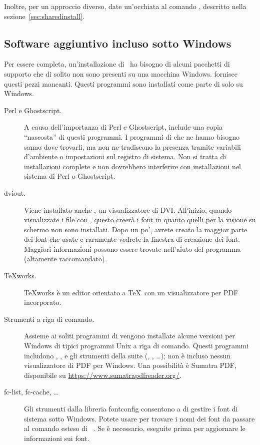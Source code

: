 \documentclass{article}
\begin{document}
Inoltre, per un approccio diverso, date un'occhiata al comando 
, descritto nella sezione~\ref{sec:sharedinstall}.

\subsection{Software aggiuntivo incluso sotto Windows}

Per essere completa, un'installazione di \TL\ ha bisogno di alcuni
pacchetti di supporto che di solito non sono presenti su una macchina
Windows. \TL{} fornisce questi pezzi mancanti. Questi programmi sono
installati come parte di \TL{} solo su Windows.

\begin{description}
\item[Perl e Ghostscript.] A causa dell'importanza di Perl e Ghostscript,
  \TL{} include una copia ``nascosta'' di questi programmi. I programmi di
  \TL{} che ne hanno bisogno sanno dove trovarli, ma non ne tradiscono la
  presenza tramite variabili d'ambiente o impostazioni sul registro di
  sistema. Non si tratta di installazioni complete e non dovrebbero
  interferire con installazioni nel sistema di Perl o Ghostscript.

\item[dviout.] Viene installato anche , un visualizzatore di
  DVI. All'inizio, quando visualizzate i file con ,
  questo creerà i font in quanto quelli per la visione su schermo non sono
  installati. Dopo un po', avrete creato la maggior parte dei font che
  usate e raramente vedrete la finestra di creazione dei font. Maggiori
  informazioni possono essere trovate nell'aiuto del programma (altamente
  raccomandato).

\item[\TeX{}works.] \TeX{}works è un editor orientato a \TeX\ con un
  visualizzatore per PDF incorporato.

\item[Strumenti a riga di comando.] Assieme ai soliti programmi di \TL{}
  vengono installate alcune versioni per Windows di tipici programmi Unix
  a riga di comando. Questi programmi includono ,
  ,  e gli strumenti della suite 
  (, , \ldots); non è incluso nessun
  visualizzatore di PDF per Windows. Una possibilità è
  Sumatra PDF, disponibile su
  \url{https://www.sumatrapdfreader.org/}.

\item[fc-list, fc-cache, \ldots] Gli strumenti dalla libreria fontconfig
  consentono a \XeTeX{} di gestire i font di sistema sotto Windows. Potete
  usare  per trovare i nomi dei font da passare al comando
  esteso di \XeTeX\ . Se è necessario, eseguite prima
   per aggiornare le informazioni sui font.

\end{description}
\end{document}
